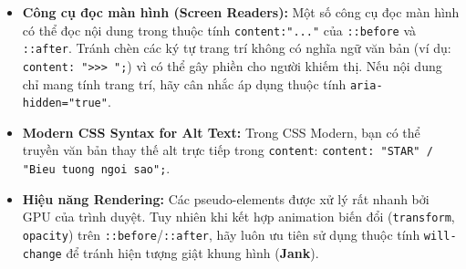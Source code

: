 \documentclass[11pt,oneside]{book}
\newcommand{\codeinline}[1]{\textcolor{accentOrange}{\texttt{#1}}}
\newcommand{\term}[1]{\textbf{\textcolor{primaryBlue}{#1}}}
\begin{document}
\begin{warnBox}
\begin{itemize}[leftmargin=1.5em, itemsep=4pt, parsep=0pt]
    \item \textbf{Công cụ đọc màn hình (Screen Readers):} Một số công cụ đọc màn hình có thể đọc nội dung trong thuộc tính \codeinline{content:"..."} của \codeinline{::before} và \codeinline{::after}. Tránh chèn các ký tự trang trí không có nghĩa ngữ văn bản (ví dụ: \codeinline{content: ">>> ";}) vì có thể gây phiền cho người khiếm thị. Nếu nội dung chỉ mang tính trang trí, hãy cân nhắc áp dụng thuộc tính \codeinline{aria-hidden="true"}.
    \item \textbf{Modern CSS Syntax for Alt Text:} Trong CSS Modern, bạn có thể truyền văn bản thay thế alt trực tiếp trong \codeinline{content}: \codeinline{content: "STAR" / "Bieu tuong ngoi sao";}.
    \item \textbf{Hiệu năng Rendering:} Các pseudo-elements được xử lý rất nhanh bởi GPU của trình duyệt. Tuy nhiên khi kết hợp animation biến đổi (\codeinline{transform}, \codeinline{opacity}) trên \codeinline{::before}/\codeinline{::after}, hãy luôn ưu tiên sử dụng thuộc tính \codeinline{will-change} để tránh hiện tượng giật khung hình (\term{Jank}).
\end{itemize}
\end{warnBox}
\end{document}
